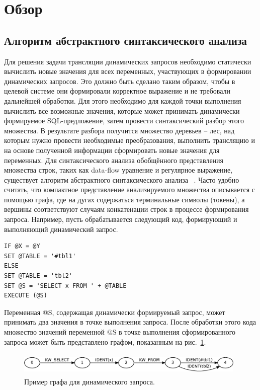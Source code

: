 \documentclass[a5paper]{article}
\begin{document}
\section{Обзор}
\subsection{Алгоритм абстрактного синтаксического анализа}

Для решения задачи трансляции динамических запросов необходимо статически вычислить новые значения для всех переменных, участвующих в формировании динамических запросов. Это должно быть сделано  таким образом, чтобы в целевой системе они формировали корректное выражение и не требовали дальнейшей обработки. Для этого необходимо для каждой точки выполнения вычислить все возможные значения, которые может принимать динамически формируемое SQL-предложение, затем провести синтаксический разбор этого множества. В результате разбора получится множество деревьев -- лес, над которым нужно провести необходимые преобразования, выполнить трансляцию и на основе полученной информации сформировать новые значения для переменных.
	Для синтаксического анализа обобщённого представления множества строк, таких как data-flow уравнение и регулярное выражение, существует алгоритм абстрактного синтаксического анализа ~\cite{AbstrParsing}. Часто удобно считать, что компактное представление анализируемого множества описывается с помощью графа, где на дугах содержаться терминальные символы (токены), а вершины соответствуют случаям конкатенации строк в процессе формирования запроса. Например, пусть обрабатывается следующий код, формирующий и выполняющий динамический запрос.
\begin{verbatim}
IF @X = @Y
SET @TABLE = '#tbl1'
ELSE
SET @TABLE = 'tbl2'
SET @S = 'SELECT x FROM ' + @TABLE
EXECUTE (@S)
\end{verbatim}
Переменная @S, содержащая динамически формируемый запрос, может принимать два значения в точке выполнения запроса. После обработки этого кода  множество значений переменной @S в точке выполнения сформированного запроса может быть представлено графом, показанным на рис.~\ref{pic1}.

\begin{figure}
    \begin{center}
        \includegraphics[width=11cm,height=1.1cm]{graphs/simple_sql.eps}
        \caption{Пример графа для динамического запроса.}
        \label{pic1}        
    \end{center}
\end{figure}
\end{document}
